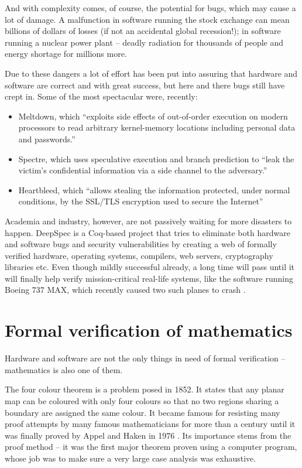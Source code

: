 \documentclass[declaration,inz,english,shortabstract]{iithesis}
\begin{document}
And with complexity comes, of course, the potential for bugs, which may cause a lot of damage. A malfunction in software running the stock exchange can mean billions of dollars of losses (if not an accidental global recession!); in software running a nuclear power plant -- deadly radiation for thousands of people and energy shortage for millions more.

Due to these dangers a lot of effort has been put into assuring that hardware and software are correct and with great success, but here and there bugs still have crept in. Some of the most spectacular were, recently:

\begin{itemize}
    \item Meltdown, which ``exploits side effects of out-of-order execution on modern processors to read arbitrary kernel-memory locations including  personal  data  and  passwords.'' \cite{Meltdown}
    \item Spectre, which uses speculative execution and branch prediction to ``leak the victim's confidential information via a side  channel to  the  adversary.'' \cite{Spectre}
    \item Heartbleed, which ``allows stealing the information protected, under normal conditions, by the SSL/TLS encryption used to secure the Internet'' \cite{Heartbleed}
\end{itemize}

Academia and industry, however, are not passively waiting for more disasters to happen. DeepSpec \cite{DeepSpec} is a Coq-based project that tries to eliminate both hardware and software bugs and security vulnerabilities by creating a web of formally verified hardware, operating systems, compilers, web servers, cryptography libraries etc. Even though mildly successful already, a long time will pass until it will finally help verify mission-critical real-life systems, like the software running Boeing 737 MAX, which recently caused two such planes to crash \cite{Boeing}.

\section{Formal verification of mathematics}

Hardware and software are not the only things in need of formal verification -- mathematics is also one of them.

The four colour theorem is a problem posed in 1852. It states that any planar map can be coloured with only four colours so that no two regions sharing a boundary are assigned the same colour. It became famous for resisting many proof attempts by many famous mathematicians for more than a century until it was finally proved by Appel and Haken in 1976 \cite{AppelHaken1} \cite{AppelHaken2} \cite{AppelHaken3} \cite{AppelHaken4}. Its importance stems from the proof method -- it was the first major theorem proven using a computer program, whose job was to make sure a very large case analysis was exhaustive.
\end{document}
